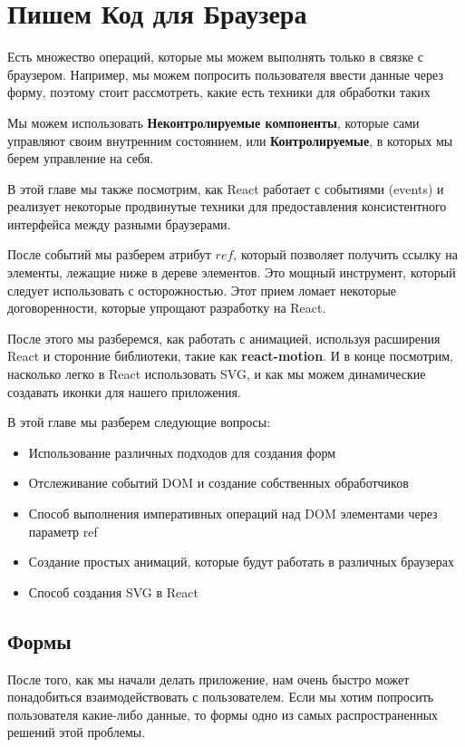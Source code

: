 \chapter{Пишем Код для Браузера}

Есть множество операций, которые мы можем выполнять только в связке с браузером. Например, мы можем попросить пользователя ввести данные через форму, поэтому стоит рассмотреть, какие есть техники для обработки таких 

Мы можем использовать \textbf{Неконтролируемые компоненты}, которые сами управляют своим внутренним состоянием, или \textbf{Контролируемые}, в которых мы берем управление на себя.

В этой главе мы также посмотрим, как React работает с событиями (events) и реализует некоторые продвинутые техники для предоставления консистентного интерфейса между разными браузерами.

После событий мы разберем атрибут $ref$, который позволяет получить ссылку на элементы, лежащие ниже в дереве элементов. Это мощный инструмент, который следует использовать с осторожностью. Этот прием ломает некоторые договоренности, которые упрощают разработку на React.

После этого мы разберемся, как работать с анимацией, используя расширения React и сторонние библиотеки, такие как \textbf{react-motion}. И в конце посмотрим, насколько легко в React использовать SVG, и как мы можем динамические создавать иконки для нашего приложения.

В этой главе мы разберем следующие вопросы:

\begin{itemize}
  \item Использование различных подходов для создания форм
  \item Отслеживание событий DOM и создание собственных обработчиков
  \item Способ выполнения императивных операций над DOM элементами через параметр ref
  \item Создание простых анимаций, которые будут работать в различных браузерах
  \item Способ создания SVG в React
\end{itemize}


\section{Формы}

После того, как мы начали делать приложение, нам очень быстро может понадобиться взаимодействовать с пользователем. Если мы хотим попросить пользователя какие-либо данные, то формы одно из самых распространенных решений этой проблемы.

